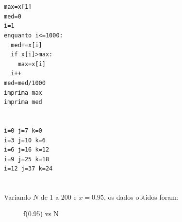 \section{} 
\begin{verbatim}
max=x[1]
med=0
i=1
enquanto i<=1000:
  med+=x[i]
  if x[i]>max:
    max=x[i]
  i++
med=med/1000
imprima max
imprima med
\end{verbatim}

\section{} 
\begin{verbatim}
i=0 j=7 k=0 
i=3 j=10 k=6 
i=6 j=16 k=12 
i=9 j=25 k=18 
i=12 j=37 k=24 
\end{verbatim}

\section{} 
Variando $N$ de 1 a 200 e $x = 0.95$, os dados obtidos foram:
\begin{figure}[htbp]
\begin{center}
\caption{f(0.95) vs N}
\label{fig_rotacao}
\end{center}
\end{figure}

